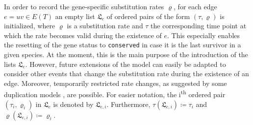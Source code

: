 \documentclass[hidelinks,11pt]{scrreprt}
\begin{document}
In order to record the gene-specific substitution rates $\varrho$, for each edge $e=uv \in E(T)$ an
empty list $\mathfrak{L}_e$ of ordered pairs of the form $(\tau,\varrho)$ is initialized, where $\varrho$ is a substitution rate and $\tau$ the corresponding time point at which the rate becomes valid during the existence of $e$. This especially enables the resetting of the gene status to \texttt{conserved} in
case it is the last survivor in a given species. At the moment, this is the main purpose of the introduction of the lists $\mathfrak{L}_e$. However, future extensions of the model can easily be adapted to consider other events that change the substitution rate during the existence of an edge. Moreover, temporarily restricted rate changes, as suggested by some duplication models \citep[cf.][]{innan2010}, are possible.
For easier notation, the i\textsuperscript{th} ordered pair $(\tau_i,\varrho_i)$ in $\mathfrak{L}_e$ is denoted by $\mathfrak{L}_{e,i}$. Furthermore, $\tau(\mathfrak{L}_{e,i}) \coloneqq \tau_i$ and
$\varrho(\mathfrak{L}_{e,i}) \coloneqq \varrho_i$.
\end{document}

